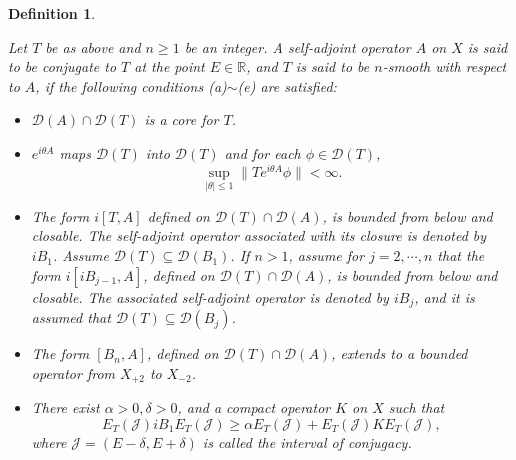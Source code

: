 \documentclass[reqno, 11pt]{amsart}
\newtheorem{definition}{Definition}[section]
\newcommand\R{\mathbb{R}}
\newcommand\mcaJ{\mathcal{J}}
\newcommand\mcaD{\mathcal{D}}
\numberwithin{equation}{section}
\begin{document}
\begin{definition}\label{condi-veri}
{\rm Let $T$ be as above and $n\geq1$ be an integer. A self-adjoint operator $A$ on $X$ is said to be conjugate to $T$ at the point $E\in\R$, and $T$ is said to be $n$-smooth with respect to $A$, if the following conditions (a)$\sim$(e) are satisfied:
\begin{itemize}
\item [(a)] $\mcaD(A)\cap\mcaD(T)$ is a core for $T$.
\item [(b)]$e^{i\theta A}$ maps $\mcaD(T)$ into $\mcaD(T)$ and for each $\phi\in\mcaD(T)$,
$$\sup_{|\theta|\leq1}\|Te^{i\theta A}\phi\|<\infty.$$
\item [({\rm$c_n$})] The form $i[T,A]$ defined on $\mcaD(T)\cap\mcaD(A)$, is bounded from below and closable. The self-adjoint operator associated with its closure is denoted by $iB_1$. Assume $\mcaD(T)\subseteq\mcaD(B_1)$. If $n>1$, assume for $j=2,\cdots,n$ that the form $i[iB_{j-1},A]$, defined on $\mcaD(T)\cap\mcaD(A)$, is bounded from below and closable. The associated self-adjoint operator is denoted by $iB_{j}$, and it is assumed that $\mcaD(T)\subseteq\mcaD(B_j)$.
\item [({\rm$d_n$})] The form $[B_n, A]$, defined on $\mcaD(T)\cap\mcaD(A)$, extends to a bounded operator from $X_{+2}$ to $X_{-2}$.
\item [(e)] There exist $\alpha>0, \delta>0$, and a compact operator $K$ on $X$ such that
\begin{equation}\label{Mourre}
E_{T}(\mcaJ)iB_1E_{T}(\mcaJ)\geq\alpha E_{T}(\mcaJ)+E_{T}(\mcaJ)KE_{T}(\mcaJ),
\end{equation}
where $\mcaJ=(E-\delta,E+\delta)$ is called the interval of conjugacy.
\end{itemize}
}
\end{definition}
\end{document}
